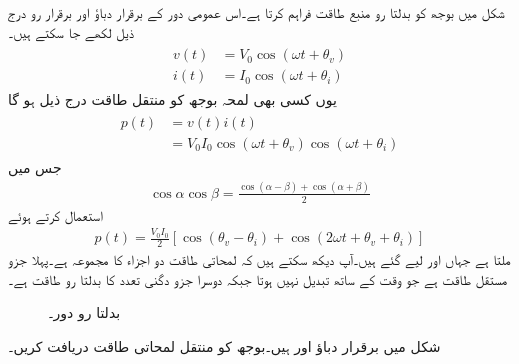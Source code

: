 
شکل  میں بوجھ  کو بدلتا رو منبع  طاقت فراہم کرتا ہے۔اس عمومی دور کے برقرار دباؤ اور برقرار رو درج ذیل لکھے جا سکتے ہیں۔
\begin{gather}
\begin{aligned}\label{مساوات_طاقت_دباو_رو_عمومی_الف}
v(t)&=V_0\cos(\omega t +\theta_v)\\
i(t)&=I_0\cos(\omega t +\theta_i)
\end{aligned}
\end{gather}
یوں کسی بھی لمحہ بوجھ کو منتقل طاقت درج ذیل ہو گا
\begin{gather}
\begin{aligned}
p(t)&=v(t)i(t)\\
&=V_0 I_0  \cos(\omega t +\theta_v) \cos(\omega t +\theta_i)
\end{aligned}
\end{gather}
جس میں
\begin{align}
\cos \alpha \cos \beta=\frac{\cos(\alpha-\beta)+\cos(\alpha+\beta)}{2}
\end{align}
استعمال کرتے ہوئے
\begin{align}\label{مساوات_طاقت_لمحاتی_طاقت_الف}
p(t)=\frac{V_0 I_0}{2}\left[\cos(\theta_v-\theta_i)+\cos(2\omega t +\theta_v+\theta_i)\right]
\end{align}
ملتا ہے جہاں  اور  لیے گئے ہیں۔آپ دیکھ سکتے ہیں کہ لمحاتی طاقت دو اجزاء کا مجموعہ ہے۔پہلا جزو مستقل طاقت ہے جو وقت کے ساتھ تبدیل نہیں ہوتا جبکہ دوسرا جزو دگنی تعدد کا بدلتا رو طاقت ہے۔  
%
\begin{figure}
\centering
{}
\caption{بدلتا رو دور۔}
\label{شکل_طاقت_پرزے_کو_منتقل}
\end{figure}
شکل  میں برقرار دباؤ  اور  ہیں۔بوجھ کو منتقل لمحاتی طاقت دریافت کریں۔

